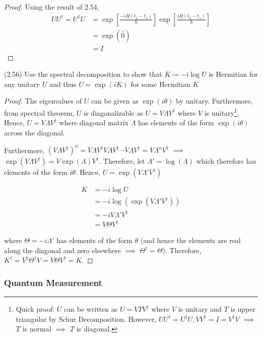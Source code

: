 \documentclass[main.tex]{subfiles}
\begin{document}
\begin{subappendices}
\begin{exercise}
\begin{proof}
Using the result of 2.54, 
	\begin{align*}
	UU^\dag = U^\dag U &= \exp[\frac{-iH(t_2 - t_1)}{\hbar}]\exp[\frac{iH(t_2 - t_1)}{\hbar}] \\
	&= 	\exp(\hat{0}) \\
	&= 	I
	\end{align*}
\end{proof}
\end{exercise}

\begin{exercise}
(2.56) Use the spectral decomposition to show that $K \coloneqq -i\log U$ is Hermitian for any unitary $U$ and thus $U = \exp(iK)$ for some Hermitian $K$
\begin{proof}
	The eigenvalues of $U$ can be given as $\exp(i\theta)$ by unitary. Furthermore, from spectral theorem, $U$ is diagonalizable as $U = V \Lambda V^\dag$ where $V$ is unitary\footnote{Quick proof: $U$ can be written as $U=VTV^\dag$ where $V$ is unitary and $T$ is upper triangular by Schur Decomposition. However, $UU^\dag = U^\dag U, VV^\dag = I = V^\dag V$ $\implies$ $T$ is normal $\implies$ $T$ is diagonal.}. Hence, $U = V \Lambda V^\dag$ where diagonal matrix $\Lambda$ has elements of the form $\exp(i\theta)$ across the diagonal. 
	
	Furthermore, $(V\Lambda V^\dag)^n = V\Lambda V^\dag V\Lambda V^\dag\cdots V\Lambda V^\dag = V\Lambda^n V^\dag$ $\implies$ $\exp(V \Lambda V^\dag) = V \exp(\Lambda) V^\dag$. Therefore, let $\Lambda' = \log(\Lambda)$ which therefore has elements of the form $i\theta$. Hence, $U = \exp(V \Lambda' V^\dag)$ 
	
	\begin{align*}
		K &= -i\log U \\
		&= -i\log (\exp(V \Lambda' V^\dag)) \\
		&= -iV \Lambda' V^\dag \\
		&= V\Theta V^\dag
	\end{align*}

where $\Theta = -i\Lambda'$ has elements of the form $\theta$ (and hence the elements are real along the diagonal and zero elsewhere $\implies$ $\Theta^\dag = \Theta$). Therefore, $K^\dag = V^\dag\Theta^\dag V = V\Theta V^\dag = K$.
\end{proof}
\end{exercise}

\subsubsection{Quantum Measurement}\label{qmeas}


\end{subappendices}
\end{document}
